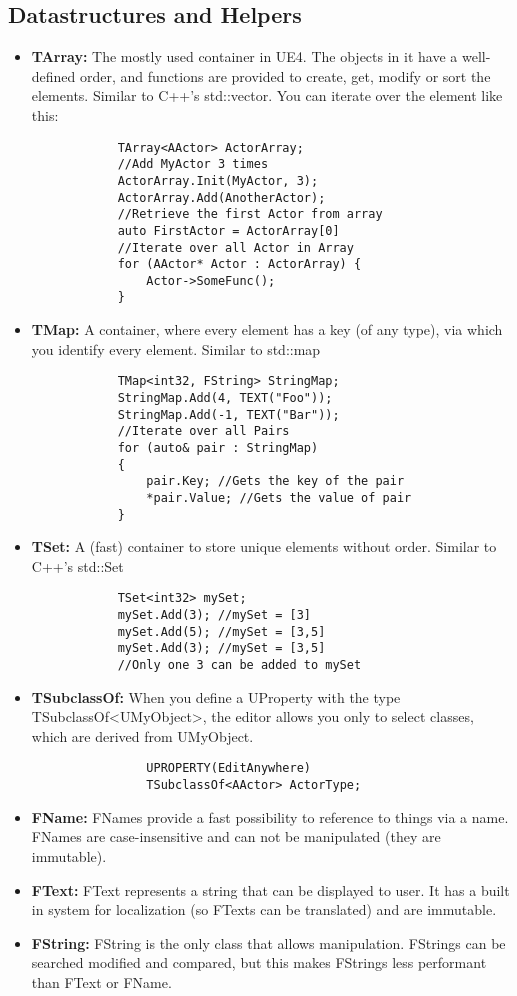 \documentclass[10pt]{article}
\begin{document}
\begin{multicols*}{5}
	\subsection{Datastructures and Helpers}
	\begin{itemize}
		\item \textbf{TArray:} The mostly used container in UE4. The objects in it have a well-defined order, and functions are provided to create, get, modify or sort the elements. Similar to C++'s std::vector. You can iterate over the element like this:
		\begin{verbatim}
			TArray<AActor> ActorArray;
			//Add MyActor 3 times
			ActorArray.Init(MyActor, 3);
			ActorArray.Add(AnotherActor);
			//Retrieve the first Actor from array
			auto FirstActor = ActorArray[0]
			//Iterate over all Actor in Array
			for (AActor* Actor : ActorArray) {
			    Actor->SomeFunc(); 
			}
		\end{verbatim}
		\item \textbf{TMap:} A container, where every element has a key (of any type), via which you identify every element. Similar to std::map
		\begin{verbatim}
			TMap<int32, FString> StringMap;
			StringMap.Add(4, TEXT("Foo"));
			StringMap.Add(-1, TEXT("Bar"));
			//Iterate over all Pairs
			for (auto& pair : StringMap)
			{
			    pair.Key; //Gets the key of the pair
			    *pair.Value; //Gets the value of pair
			}
		\end{verbatim}
		\item \textbf{TSet:} A (fast) container to store unique elements without order. Similar to C++'s std::Set
			\begin{verbatim}
			TSet<int32> mySet;
			mySet.Add(3); //mySet = [3]
			mySet.Add(5); //mySet = [3,5]
			mySet.Add(3); //mySet = [3,5]
			//Only one 3 can be added to mySet
			\end{verbatim}
		\item \textbf{TSubclassOf:} When you define a UProperty with the type TSubclassOf{\textless}UMyObject{\textgreater}, the editor allows you only to select classes, which are derived from UMyObject.
			\begin{verbatim}
				UPROPERTY(EditAnywhere)
				TSubclassOf<AActor> ActorType;
			\end{verbatim}
		\item \textbf{FName:} FNames provide a fast possibility to reference to things via a name. FNames are case-insensitive and can not be manipulated (they are immutable).
		\item \textbf{FText:} FText represents a string that can be displayed to user. It has a built in system for localization (so FTexts can be translated) and are immutable.
		\item \textbf{FString:} FString is the only class that allows manipulation. FStrings can be searched modified and compared, but this makes FStrings less performant than FText or FName.
	\end{itemize}


\end{multicols*}
\end{document}
